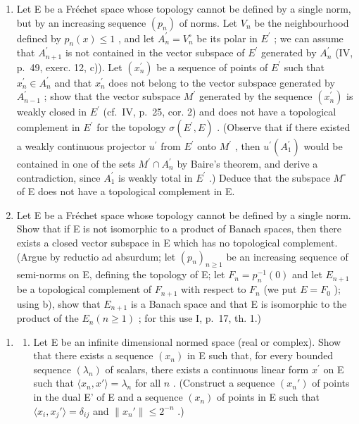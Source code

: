 \begin{enumerate}
\def\labelenumi{\alph{enumi})}
\setcounter{enumi}{1}
\item
  Let E be a Fréchet space whose topology cannot be defined by a single norm, but by an increasing sequence \((p_{n})\) of norms. Let \(V_{n}\) be the neighbourhood defined by \(p_{n}(x) \leqslant 1\) , and let \(A_{n}^{\prime} = V_{n}^{\circ}\) be its polar in \(E^{\prime}\) ; we can assume that \(A_{n+1}^{\prime}\) is not contained in the vector subspace of \(E^{\prime}\) generated by \(A_{n}^{\prime}\) (IV, p.~49, exerc. 12, c)). Let \((x_{n}^{\prime})\) be a sequence of points of \(E^{\prime}\) such that \(x_{n}^{\prime} \in A_{n}^{\prime}\) and that \(x_{n}^{\prime}\) does not belong to the vector subspace generated by \(A_{n-1}^{\prime}\) ; show that the vector subspace \(M^{\prime}\) generated by the sequence \((x_{n}^{\prime})\) is weakly closed in \(E^{\prime}\) (cf.~IV, p.~25, cor. 2) and does not have a topological complement in \(E^{\prime}\) for the topology \(\sigma(E^{\prime}, E)\) . (Observe that if there existed a weakly continuous projector \(u^{\prime}\) from \(E^{\prime}\) onto \(M^{\prime}\) , then \(u^{\prime}(A_{1}^{\prime})\) would be contained in one of the sets \(M^{\prime} \cap A_{n}^{\prime}\) by Baire's theorem, and derive a contradiction, since \(A_{1}^{\prime}\) is weakly total in \(E^{\prime}\) .) Deduce that the subspace \(M^{\circ}\) of E does not have a topological complement in E.
\item
  Let E be a Fréchet space whose topology cannot be defined by a single norm. Show that if E is not isomorphic to a product of Banach spaces, then there exists a closed vector subspace in E which has no topological complement. (Argue by reductio ad absurdum; let \((p_{n})_{n\geqslant1}\) be an increasing sequence of semi-norms on E, defining the topology of E; let \(F_{n}=p_{n}^{-1}(0)\) and let \(E_{n+1}\) be a topological complement of \(F_{n+1}\) with respect to \(F_{n}\) (we put \(E=F_{0}\) ); using b), show that \(E_{n+1}\) is a Banach space and that E is isomorphic to the product of the \(E_{n}(n\geqslant1)\) ; for this use I, p.~17, th. 1.)
\end{enumerate}

\begin{enumerate}
\def\labelenumi{\arabic{enumi})}
\setcounter{enumi}{14}
\tightlist
\item
  \begin{enumerate}
  \def\labelenumii{\alph{enumii})}
  \tightlist
  \item
    Let E be an infinite dimensional normed space (real or complex). Show that there exists a sequence \((x_{n})\) in E such that, for every bounded sequence \((\lambda_{n})\) of scalars, there exists a continuous linear form \(x^{\prime}\) on E such that \(\langle x_n,x'\rangle = \lambda_n\) for all \(n\) . (Construct a sequence \((x_n')\) of points in the dual E' of E and a sequence \((x_{n})\) of points in E such that \(\langle x_i,x_j'\rangle = \delta_{ij}\) and \(\| x_n'\| \leqslant 2^{-n}\) .)
  \end{enumerate}
\end{enumerate}

